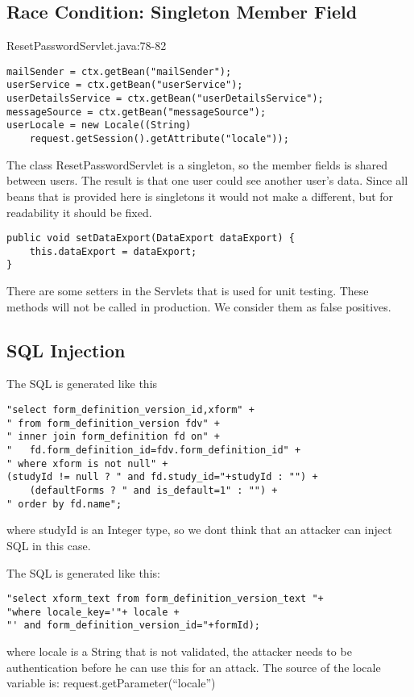 \documentclass[11pt,a4paper]{article}
\theoremstyle{definition}
\begin{document}
\subsection{Race Condition: Singleton Member Field}
ResetPasswordServlet.java:78-82
\begin{lstlisting}
mailSender = ctx.getBean("mailSender");
userService = ctx.getBean("userService");
userDetailsService = ctx.getBean("userDetailsService");
messageSource = ctx.getBean("messageSource");
userLocale = new Locale((String)
	request.getSession().getAttribute("locale"));
\end{lstlisting}
The class ResetPasswordServlet is a singleton, so the member fields is shared between users.
The result is that one user could see another user's data.
Since all beans that is provided here is singletons it would not make a different, but for readability it should be fixed.


\begin{lstlisting}[caption=DataExportServlet.java:116 ++]
public void setDataExport(DataExport dataExport) {
    this.dataExport = dataExport;
}
\end{lstlisting}
There are some setters in the Servlets that is used for unit testing. These methods will not be called in production.
We consider them as false positives.

\subsection{SQL Injection}
The SQL is generated like this
\begin{lstlisting}[caption=HibernateFormDownloadDAO.java:113]
"select form_definition_version_id,xform" +
" from form_definition_version fdv" +
" inner join form_definition fd on" +
"   fd.form_definition_id=fdv.form_definition_id" +
" where xform is not null" +
(studyId != null ? " and fd.study_id="+studyId : "") +
    (defaultForms ? " and is_default=1" : "") +
" order by fd.name";
\end{lstlisting}
where studyId is an Integer type, so we dont think that an attacker can inject SQL in this case.


The SQL is generated like this:
\begin{lstlisting}[caption=HibernateFormDownloadDAO.java:149]
"select xform_text from form_definition_version_text "+
"where locale_key='"+ locale +
"' and form_definition_version_id="+formId);
\end{lstlisting}
where locale is a String that is not validated, the attacker needs to be authentication before he can use this for an attack.
The source of the locale variable is: request.getParameter(``locale'')
\end{document}
